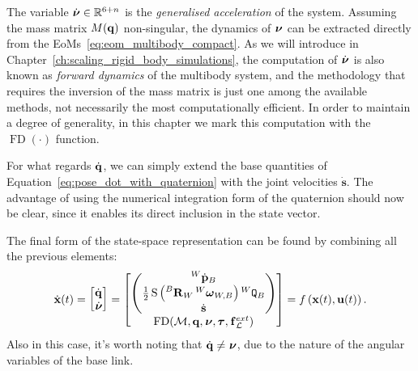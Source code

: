 The variable $\prescript{}{}{\dot{\boldsymbol{\nu}}} \in \mathbb{R}^{6+n}$ is the \emph{generalised acceleration} of the system.
Assuming the mass matrix $M(\mathbf{q})$ non-singular, the dynamics of $\prescript{}{}{\boldsymbol{\nu}}$ can be extracted directly from the \acp{EoM}~\eqref{eq:eom_multibody_compact}.
As we will introduce in Chapter~\ref{ch:scaling_rigid_body_simulations}, the computation of $\prescript{}{}{\dot{\boldsymbol{\nu}}}$ is also known as \emph{forward dynamics} of the multibody system, and the methodology that requires the inversion of the mass matrix is just one among the available methods, not necessarily the most computationally efficient.
In order to maintain a degree of generality, in this chapter we mark this computation with the $\operatorname{FD}(\cdot)$ function.

For what regards $\dot{\mathbf{q}}$, we can simply extend the base quantities of Equation~\eqref{eq:pose_dot_with_quaternion} with the joint velocities $\dot{\mathbf{s}}$.
The advantage of using the numerical integration form of the quaternion should now be clear, since it enables its direct inclusion in the state vector.

The final form of the state-space representation can be found by combining all the previous elements:
%
\begin{equation}
    \label{equation:floatig_base_dynamics_state_space}
    \dot{\mathbf{x}}(t) =
    \begin{bmatrix}
        \Qud \\ \Nud
    \end{bmatrix} =
    \begin{bmatrix}
        \begin{pmatrix}
            \posd[W]_B \\
            \frac{1}{2} \operatorname{S}\left( \rot[B]_W \velang[W]_{W,B} \right) \quat[W]_B \\
            \dot{\mathbf{s}}
        \end{pmatrix}
        \\
        \operatorname{FD}(\mathcal{M}, \Qu, \Nu, \Torques, \forcesix_\mathcal{L}^{ext})
    \end{bmatrix} =
    f\left(\mathbf{x}(t), \mathbf{u}(t)\right)
    .
\end{equation}
%
Also in this case, it's worth noting that $\dot{\mathbf{q}} \neq \prescript{}{}{\boldsymbol{\nu}}$, due to the nature of the angular variables of the base link. 

